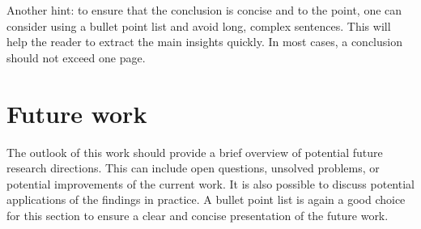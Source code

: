 Another hint: to ensure that the conclusion is concise and to the point, one can consider using a bullet point list and avoid long, complex sentences. This will help the reader to extract the main insights quickly. In most cases, a conclusion should not exceed one page.


\section{Future work}
\label{sec:futurework}
The outlook of this work should provide a brief overview of potential future research directions. This can include open questions, unsolved problems, or potential improvements of the current work. It is also possible to discuss potential applications of the findings in practice. A bullet point list is again a good choice for this section to ensure a clear and concise presentation of the future work. 

